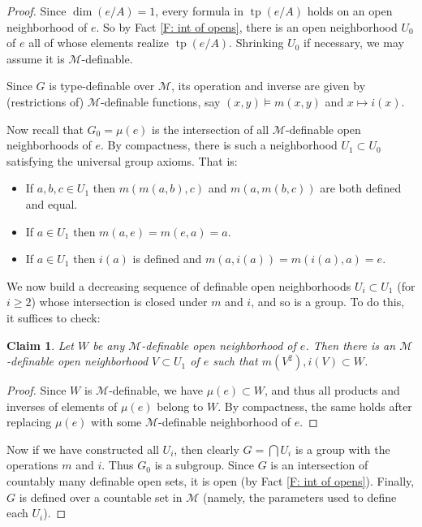 \documentclass{amsart}
\newtheorem{claim}[theorem]{Claim}
\theoremstyle{definition}
\newcommand{\tp}{\operatorname{tp}}
\begin{document}
\begin{proof}
    Since $\dim(e/A)=1$, every formula in $\tp(e/A)$ holds on an open neighborhood of $e$. So by Fact \ref{F: int of opens}, there is an open neighborhood $U_0$ of $e$ all of whose elements realize $\tp(e/A)$. Shrinking $U_0$ if necessary, we may assume it is $\mathcal M$-definable.

    Since $G$ is type-definable over $\mathcal M$, its operation and inverse are given by (restrictions of) $\mathcal M$-definable functions, say $(x,y)\models m(x,y)$ and $x\mapsto i(x)$.

    Now recall that $G_0=\mu(e)$ is the intersection of all $\mathcal M$-definable open neighborhoods of $e$. By compactness, there is such a neighborhood $U_1\subset U_0$ satisfying the universal group axioms. That is:
    \begin{itemize}
        \item If $a,b,c\in U_1$ then $m(m(a,b),c)$ and $m(a,m(b,c))$ are both defined and equal.
        \item If $a\in U_1$ then $m(a,e)=m(e,a)=a$.
        \item If $a\in U_1$ then $i(a)$ is defined and $m(a,i(a))=m(i(a),a)=e$.
    \end{itemize}
    We now build a decreasing sequence of definable open neighborhoods $U_i\subset U_1$ (for $i\geq 2$) whose intersection is closed under $m$ and $i$, and so is a group. To do this, it suffices to check:
    \begin{claim}
        Let $W$ be any $\mathcal M$-definable open neighborhood of $e$. Then there is an $\mathcal M$-definable open neighborhood $V\subset U_1$ of $e$ such that $m(V^2),i(V)\subset W$.
    \end{claim}
    \begin{proof}
        Since $W$ is $\mathcal M$-definable, we have $\mu(e)\subset W$, and thus all products and inverses of elements of $\mu(e)$ belong to $W$. By compactness, the same holds after replacing $\mu(e)$ with some $\mathcal M$-definable neighborhood of $e$.
    \end{proof}
    Now if we have constructed all $U_i$, then clearly $G=\bigcap U_i$ is a group with the operations $m$ and $i$. Thus $G_0$ is a subgroup. Since $G$ is an intersection of countably many definable open sets, it is open (by Fact \ref{F: int of opens}). Finally, $G$ is defined over a countable set in $\mathcal M$ (namely, the parameters used to define each $U_i$).
    \end{proof}
\end{document}
